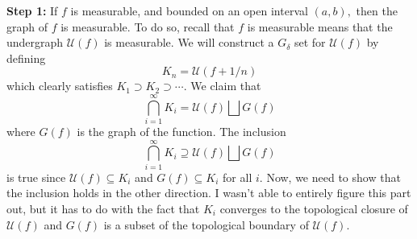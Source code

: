 \documentclass{article}
\begin{document}
\begin{enumerate}
\begin{enumerate}[label=(\alph*)]
        \textbf{Step 1:} If $f$ is measurable, and bounded on an open interval $(a,b),$ then the graph of $f$ is measurable. To do so, recall that $f$ is measurable means that the undergraph $\mathcal{U}(f)$ is measurable. We will construct a $G_\delta$ set for $\mathcal{U}(f)$ by defining 
        \begin{equation}
            K_n = \mathcal{U}(f + 1/n)
        \end{equation}
        which clearly satisfies $K_1 \supset K_2 \supset \cdots.$ We claim that 
        \begin{equation}
           \bigcap_{i=1}^{\infty} K_i = \mathcal{U}(f) \bigsqcup G(f) 
        \end{equation}
        where $G(f)$ is the graph of the function. The inclusion 
        \begin{equation}
            \bigcap_{i=1}^{\infty} K_i \supseteq \mathcal{U}(f) \bigsqcup G(f) 
        \end{equation} is true since $\mathcal{U}(f) \subseteq K_i$ and $G(f) \subseteq K_i$ for all $i.$ Now, we need to show that the inclusion holds in the other direction. I wasn't able to entirely figure this part out, but it has to do with the fact that $K_i$ converges to the topological closure of $\mathcal{U}(f)$ and $G(f)$ is a subset of the topological boundary of $\mathcal{U}(f).$
        

\end{enumerate}
\end{enumerate}
\end{document}
